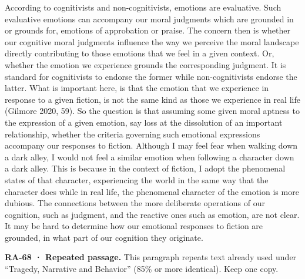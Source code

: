 \documentclass[
  letterpaper,
  DIV=11,
  numbers=noendperiod]{scrartcl}
\theoremstyle{remark}
\begin{document}
According to cognitivists and non-cognitivists, emotions are evaluative.
Such evaluative emotions can accompany our moral judgments which are
grounded in or grounds for, emotions of approbation or praise. The
concern then is whether our cognitive moral judgments influence the way
we perceive the moral landscape directly contributing to those emotions
that we feel in a given context. Or, whether the emotion we experience
grounds the corresponding judgment. It is standard for cognitivists to
endorse the former while non-cognitivists endorse the latter. What is
important here, is that the emotion that we experience in response to a
given fiction, is not the same kind as those we experience in real life
(Gilmore 2020, 59). So the question is that assuming some given moral
aptness to the expression of a given emotion, say loss at the
dissolution of an important relationship, whether the criteria governing
such emotional expressions accompany our responses to fiction. Although
I may feel fear when walking down a dark alley, I would not feel a
similar emotion when following a character down a dark alley. This is
because in the context of fiction, I adopt the phenomenal states of that
character, experiencing the world in the same way that the character
does while in real life, the phenomenal character of the emotion is more
dubious. The connections between the more deliberate operations of our
cognition, such as judgment, and the reactive ones such as emotion, are
not clear. It may be hard to determine how our emotional responses to
fiction are grounded, in what part of our cognition they originate.

\begin{tcolorbox}[enhanced jigsaw, arc=.35mm, bottomrule=.15mm, bottomtitle=1mm, breakable, colback=white, colbacktitle=quarto-callout-important-color!10!white, colframe=quarto-callout-important-color-frame, coltitle=black, left=2mm, leftrule=.75mm, opacityback=0, opacitybacktitle=0.6, rightrule=.15mm, title=\textcolor{quarto-callout-important-color}{\faExclamation}\hspace{0.5em}{Important}, titlerule=0mm, toprule=.15mm, toptitle=1mm]

\textbf{RA-68 · Repeated passage.} This paragraph repeats text already
used under ``Tragedy, Narrative and Behavior'' (85\% or more identical).
Keep one copy.

\end{tcolorbox}
\end{document}
